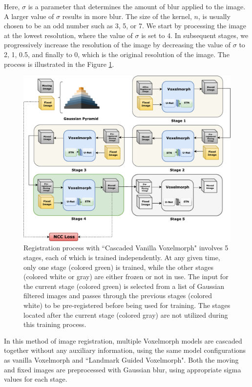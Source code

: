 \documentclass{book}
\begin{document}
	Here, $\sigma$ is a parameter that determines the amount of blur applied to the image. A larger value of $\sigma$ results in more blur. The size of the kernel, $n$, is usually chosen to be an odd number such as 3, 5, or 7. We start by processing the image at the lowest resolution, where the value of $\sigma$ is set to 4. In subsequent stages, we progressively increase the resolution of the image by decreasing the value of $\sigma$ to 2, 1, 0.5, and finally to 0, which is the original resolution of the image.
	The process is illustrated in the Figure \ref{fig:block_Cascaded Vanilla Voxelmorph}.
	
    \begin{figure}[h!]
		\centering
		\includegraphics[width=\columnwidth]{resources/chapter4/methods/Method3.pdf}
		\caption{Registration process with ``Cascaded Vanilla Voxelmorph" involves 5 stages, each of which is trained independently. At any given time, only one stage (colored green) is trained, while the other stages (colored white or gray) are either frozen or not in use. The input for the current stage (colored green) is selected from a list of Gaussian filtered images and passes through the previous stages (colored white) to be pre-registered before being used for training. The stages located after the current stage (colored gray) are not utilized during this training process.}
		\label{fig:block_Cascaded Vanilla Voxelmorph}
	\end{figure}

	In this method of image registration, multiple Voxelmorph models are cascaded together without any auxiliary information, using the same model configurations as vanilla Voxelmorph and ``Landmark Guided Voxelmorph". Both the moving and fixed images are preprocessed with Gaussian blur, using appropriate sigma values for each stage.
	
\end{document}
